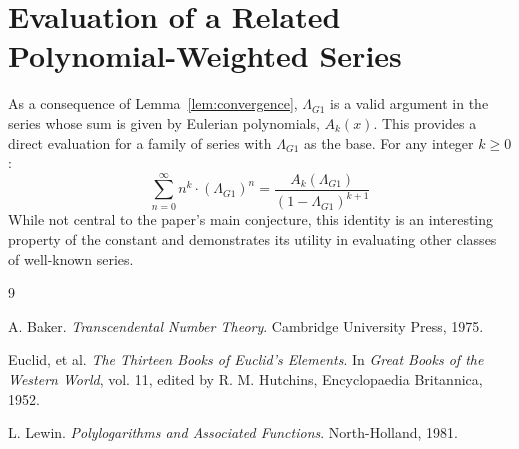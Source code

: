 \documentclass{amsart}
\theoremstyle{plain}
\theoremstyle{definition}
\theoremstyle{remark}
\newcommand{\LambdaG}{\Lambda_{G1}}
\begin{document}
\section{Evaluation of a Related Polynomial-Weighted Series}
As a consequence of Lemma~\ref{lem:convergence}, $\LambdaG$ is a valid argument in the series whose sum is given by Eulerian polynomials, $A_k(x)$. This provides a direct evaluation for a family of series with $\LambdaG$ as the base. For any integer $k \ge 0$:
\[ \sum_{n=0}^{\infty} n^k \cdot (\LambdaG)^n = \frac{A_k(\LambdaG)}{(1-\LambdaG)^{k+1}} \]
While not central to the paper's main conjecture, this identity is an interesting property of the constant and demonstrates its utility in evaluating other classes of well-known series.

\begin{thebibliography}{9}

A. Baker. \textit{Transcendental Number Theory}. Cambridge University Press, 1975.

Euclid, et al. \textit{The Thirteen Books of Euclid's Elements}. In \textit{Great Books of the Western World}, vol. 11, edited by R. M. Hutchins, Encyclopaedia Britannica, 1952.

L. Lewin. \textit{Polylogarithms and Associated Functions}. North-Holland, 1981.

\end{thebibliography}
\end{document}
